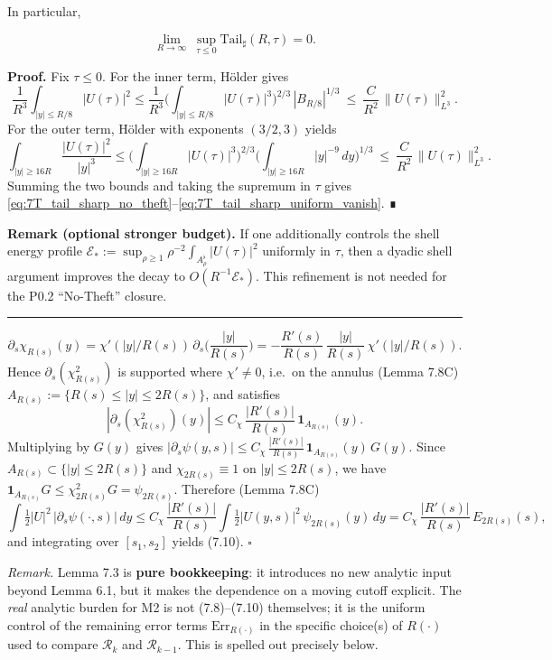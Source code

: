 \documentclass[
  11pt,
]{article}
\begin{document}
In particular,

\begin{equation}
\lim_{R\to\infty}\ \sup_{\tau\le0}\mathrm{Tail}_\sharp(R,\tau)=0.
\tag{7.TNT}\label{eq:7T_tail_sharp_uniform_vanish}
\end{equation}

\textbf{Proof.} Fix \(\tau\le0\). For the inner term, Hölder gives \[
\frac{1}{R^3}\int_{|y|\le R/8}|U(\tau)|^2
\le
\frac{1}{R^3}\Big(\int_{|y|\le R/8}|U(\tau)|^3\Big)^{2/3}\,|B_{R/8}|^{1/3}
\ \le\ \frac{C}{R^2}\,\|U(\tau)\|_{L^3}^2.
\] For the outer term, Hölder with exponents \((3/2,3)\) yields \[
\int_{|y|\ge 16R}\frac{|U(\tau)|^2}{|y|^3}
\le
\Big(\int_{|y|\ge 16R}|U(\tau)|^3\Big)^{2/3}
\Big(\int_{|y|\ge 16R}|y|^{-9}\,dy\Big)^{1/3}
\ \le\ \frac{C}{R^2}\,\|U(\tau)\|_{L^3}^2.
\] Summing the two bounds and taking the supremum in \(\tau\) gives \eqref{eq:7T_tail_sharp_no_theft}--\eqref{eq:7T_tail_sharp_uniform_vanish}. ∎

\textbf{Remark (optional stronger budget).} If one additionally controls the shell energy profile \(\mathcal E_*\!:=\sup_{\rho\ge1}\rho^{-2}\int_{A_\rho^\flat}|U(\tau)|^2\) uniformly in \(\tau\), then a dyadic shell argument improves the decay to \(O(R^{-1}\mathcal E_*)\). This refinement is not needed for the P0.2 ``No-Theft'' closure.

\begin{center}\rule{0.5\linewidth}{0.5pt}\end{center}

\[
\partial_s\chi_{R(s)}(y)
=\chi'(|y|/R(s))\,\partial_s\Big(\frac{|y|}{R(s)}\Big)
= -\frac{R'(s)}{R(s)}\,\frac{|y|}{R(s)}\,\chi'(|y|/R(s)).
\] Hence \(\partial_s(\chi_{R(s)}^2)\) is supported where \(\chi'\neq0\), i.e.~on the annulus (Lemma 7.8C) \(A_{R(s)}:=\{R(s)\le|y|\le 2R(s)\}\), and satisfies \[
|\partial_s(\chi_{R(s)}^2)(y)|
\le
C_\chi\,\frac{|R'(s)|}{R(s)}\,\mathbf 1_{A_{R(s)}}(y).
\] Multiplying by \(G(y)\) gives \(|\partial_s\psi(y,s)|\le C_\chi\,\frac{|R'(s)|}{R(s)}\,\mathbf 1_{A_{R(s)}}(y)\,G(y).\) Since \(A_{R(s)}\subset\{|y|\le 2R(s)\}\) and \(\chi_{2R(s)}\equiv1\) on \(|y|\le 2R(s)\), we have \(\mathbf 1_{A_{R(s)}}G\le \chi_{2R(s)}^2G=\psi_{2R(s)}\). Therefore (Lemma 7.8C) \[
\int \tfrac12|U|^2\,|\partial_s\psi(\cdot,s)|\,dy
\le
C_\chi\,\frac{|R'(s)|}{R(s)}\int \tfrac12|U(y,s)|^2\,\psi_{2R(s)}(y)\,dy
=
C_\chi\,\frac{|R'(s)|}{R(s)}\,E_{2R(s)}(s),
\] and integrating over \([s_1,s_2]\) yields (7.10). \(\square\)

\emph{Remark.} Lemma 7.3 is \textbf{pure bookkeeping}: it introduces no new analytic input beyond Lemma 6.1, but it makes the dependence on a moving cutoff explicit. The \emph{real} analytic burden for M2 is not (7.8)--(7.10) themselves; it is the uniform control of the remaining error terms \(\mathrm{Err}_{R(\cdot)}\) in the specific choice(s) of \(R(\cdot)\) used to compare \(\mathcal R_k\) and \(\mathcal R_{k-1}\). This is spelled out precisely below.
\end{document}
